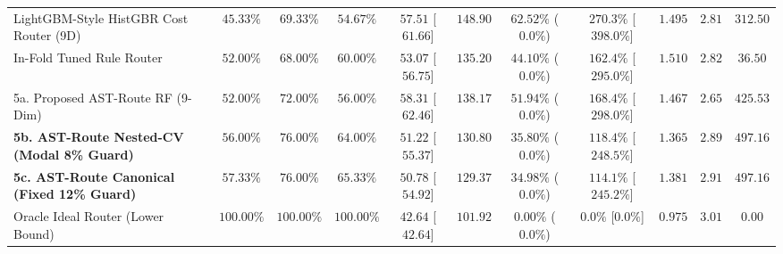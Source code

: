 \documentclass[10pt,a4paper]{article}
\newenvironment{fitasttable}{%
  \begin{lrbox}{\asttblbox}%
}{%
  \end{lrbox}%
  \sbox{\asttblboxB}{%
    \ifdim\wd\asttblbox>0.96\textwidth
      \resizebox{0.96\textwidth}{!}{\usebox{\asttblbox}}%
    \else
      \usebox{\asttblbox}%
    \fi
  }%
  \ifdim\ht\asttblboxB>0.72\textheight
    \resizebox{!}{0.72\textheight}{\usebox{\asttblboxB}}%
  \else
    \usebox{\asttblboxB}%
  \fi
}
\begin{document}
\begin{table}[!htbp]
\begin{fitasttable}
\begin{tabular}{@{}lcccccccccc@{}}
LightGBM-Style HistGBR Cost Router (9D) & $45.33\%$ & $69.33\%$ & $54.67\%$ & $57.51$ [$61.66$] & $148.90$ & $62.52\%$ ($0.0\%$) & $270.3\%$ [$398.0\%$] & $1.495$ & $2.81$ & $312.50$ \\
In-Fold Tuned Rule Router & $52.00\%$ & $68.00\%$ & $60.00\%$ & $53.07$ [$56.75$] & $135.20$ & $44.10\%$ ($0.0\%$) & $162.4\%$ [$295.0\%$] & $1.510$ & $2.82$ & $36.50$ \\
5a. Proposed AST-Route RF (9-Dim) & $52.00\%$ & $72.00\%$ & $56.00\%$ & $58.31$ [$62.46$] & $138.17$ & $51.94\%$ ($0.0\%$) & $168.4\%$ [$298.0\%$] & $1.467$ & $2.65$ & $425.53$ \\
\textbf{5b. AST-Route Nested-CV (Modal 8\% Guard)} & $\mathbf{56.00\%}$ & $\mathbf{76.00\%}$ & $\mathbf{64.00\%}$ & $\mathbf{51.22}$ [$\mathbf{55.37}$] & $\mathbf{130.80}$ & $\mathbf{35.80\%}$ ($\mathbf{0.0\%}$) & $\mathbf{118.4\%}$ [$\mathbf{248.5\%}$] & $\mathbf{1.365}$ & $\mathbf{2.89}$ & $\mathbf{497.16}$ \\
\textbf{5c. AST-Route Canonical (Fixed 12\% Guard)} & $\mathbf{57.33\%}$ & $\mathbf{76.00\%}$ & $\mathbf{65.33\%}$ & $\mathbf{50.78}$ [$\mathbf{54.92}$] & $\mathbf{129.37}$ & $\mathbf{34.98\%}$ ($\mathbf{0.0\%}$) & $\mathbf{114.1\%}$ [$\mathbf{245.2\%}$] & $\mathbf{1.381}$ & $\mathbf{2.91}$ & $\mathbf{497.16}$ \\
Oracle Ideal Router (Lower Bound) & $100.00\%$ & $100.00\%$ & $100.00\%$ & $42.64$ [$42.64$] & $101.92$ & $0.00\%$ ($0.0\%$) & $0.0\%$ [$0.0\%$] & $0.975$ & $3.01$ & $0.00$ \\
\bottomrule

\end{tabular}
\end{fitasttable}
\end{table}
\end{document}
